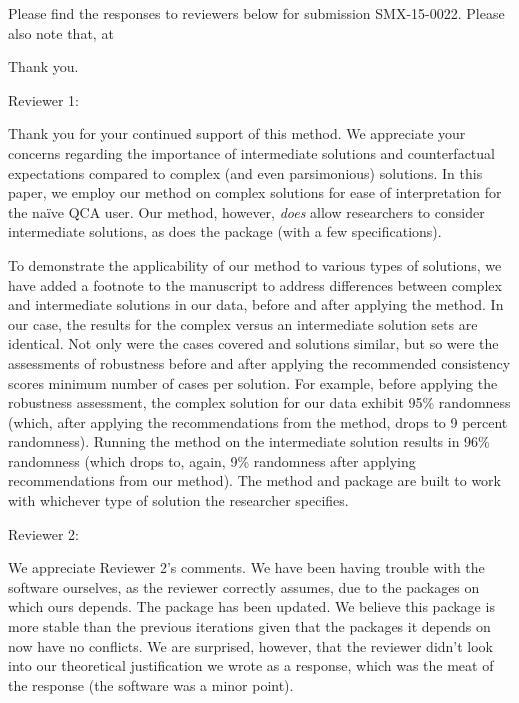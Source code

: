 \documentclass[12pt,stdletter,dateno,sigleft]{newlfm} %
\begin{document}
\begin{newlfm}


Please find the responses to reviewers below for submission SMX-15-0022. Please also note that, at %

Thank you. \newline

Reviewer 1: 

Thank you for your continued support of this method. We appreciate your concerns regarding the importance of intermediate solutions and counterfactual expectations compared to complex (and even parsimonious) solutions. In this paper, we employ our method on complex solutions for ease of interpretation for the na{\"i}ve QCA user. Our method, however, \textit{does} allow researchers to consider intermediate solutions, as does the package (with a few specifications). 

To demonstrate the applicability of our method to various types of solutions, we have added a footnote to the manuscript to address differences between complex and intermediate solutions in our data, before and after applying the method. In our case, the results for the complex versus an intermediate solution sets are identical. Not only were the cases covered and solutions similar, but so were the assessments of robustness before and after applying the recommended consistency scores minimum number of cases per solution. For example, before applying the robustness assessment, the complex solution for our data exhibit 95\% randomness (which, after applying the recommendations from the method, drops to 9 percent randomness). Running the method on the intermediate solution results in 96\% randomness (which drops to, again, 9\% randomness after applying recommendations from our method). The method and package are built to work with whichever type of solution the researcher specifies. \newline

Reviewer 2: 

We appreciate Reviewer 2's comments. We have been having trouble with the software ourselves, as the reviewer correctly assumes, due to the packages on which ours depends. The package has been updated. We believe this package is more stable than the previous iterations given that the packages it depends on now have no conflicts. We are surprised, however, that the reviewer didn't look into our theoretical justification we wrote as a response, which was the meat of the response (the software was a minor point). \newline



\end{newlfm}
\end{document}
